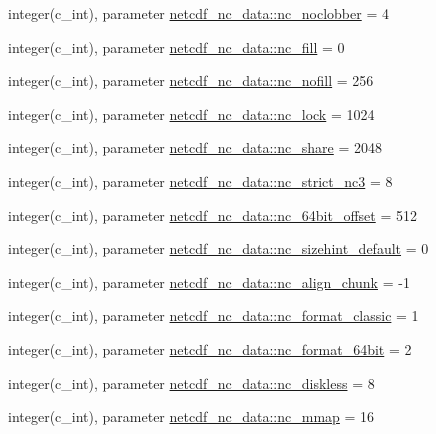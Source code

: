 \begin{DoxyCompactItemize}
\item 
integer(c\+\_\+int), parameter \hyperlink{namespacenetcdf__nc__data_aaf7a0a7e557b1b321d19d30e1211f14d}{netcdf\+\_\+nc\+\_\+data\+::nc\+\_\+noclobber} = 4
\item 
integer(c\+\_\+int), parameter \hyperlink{namespacenetcdf__nc__data_a9474c1e8363819852aef3786fcbdb3b3}{netcdf\+\_\+nc\+\_\+data\+::nc\+\_\+fill} = 0
\item 
integer(c\+\_\+int), parameter \hyperlink{namespacenetcdf__nc__data_a91a7bc224294e11fb792e4c54ea2f491}{netcdf\+\_\+nc\+\_\+data\+::nc\+\_\+nofill} = 256
\item 
integer(c\+\_\+int), parameter \hyperlink{namespacenetcdf__nc__data_ae12d4f97414d40d37a87d41a522912f1}{netcdf\+\_\+nc\+\_\+data\+::nc\+\_\+lock} = 1024
\item 
integer(c\+\_\+int), parameter \hyperlink{namespacenetcdf__nc__data_af9e4915085fa53a31b8abefaa2777261}{netcdf\+\_\+nc\+\_\+data\+::nc\+\_\+share} = 2048
\item 
integer(c\+\_\+int), parameter \hyperlink{namespacenetcdf__nc__data_a6d9e01060b38ab924ba20551f7dbfa60}{netcdf\+\_\+nc\+\_\+data\+::nc\+\_\+strict\+\_\+nc3} = 8
\item 
integer(c\+\_\+int), parameter \hyperlink{namespacenetcdf__nc__data_a7c5ba5f8ee469226a3292f7455822486}{netcdf\+\_\+nc\+\_\+data\+::nc\+\_\+64bit\+\_\+offset} = 512
\item 
integer(c\+\_\+int), parameter \hyperlink{namespacenetcdf__nc__data_ad6e4c122a6ffd511178598b1447c21a5}{netcdf\+\_\+nc\+\_\+data\+::nc\+\_\+sizehint\+\_\+default} = 0
\item 
integer(c\+\_\+int), parameter \hyperlink{namespacenetcdf__nc__data_a1c065ce771c3dceae59ab9d8b14d2d09}{netcdf\+\_\+nc\+\_\+data\+::nc\+\_\+align\+\_\+chunk} = -\/1
\item 
integer(c\+\_\+int), parameter \hyperlink{namespacenetcdf__nc__data_ae9cc945abafec8eb23d5f584342d3aa3}{netcdf\+\_\+nc\+\_\+data\+::nc\+\_\+format\+\_\+classic} = 1
\item 
integer(c\+\_\+int), parameter \hyperlink{namespacenetcdf__nc__data_a986b9f17c6b9d448234be36983851f89}{netcdf\+\_\+nc\+\_\+data\+::nc\+\_\+format\+\_\+64bit} = 2
\item 
integer(c\+\_\+int), parameter \hyperlink{namespacenetcdf__nc__data_ac35e829ff86d95f09db687f1c34a5d50}{netcdf\+\_\+nc\+\_\+data\+::nc\+\_\+diskless} = 8
\item 
integer(c\+\_\+int), parameter \hyperlink{namespacenetcdf__nc__data_acd96905f0345296902806ac08859f757}{netcdf\+\_\+nc\+\_\+data\+::nc\+\_\+mmap} = 16

\end{DoxyCompactItemize}
